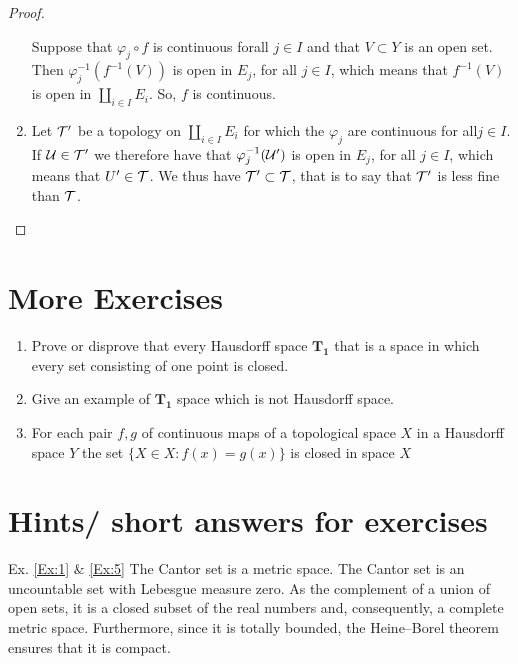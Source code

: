 \begin{proof}
\begin{enumerate}
Suppose that $\varphi_j\circ f$ is continuous forall $j\in I$ and that $V \subset Y$ is an open set. Then $ \varphi_j^{-1}(f^{-1}(V))$ is open in
$E_j $, for all $ j \in I$, which means that $f^{-1}(V)$ is open in $ \coprod_{i\in I}E_i$. So, $f$ is continuous.

\vspace{5pt}
\item Let $\mathcal{T}'$ be a topology on $\coprod_{i\in I}E_i$ for which the $\varphi_j$ are continuous for all$j \in I$. If $\mathcal{U}\in \mathcal{T}'$ we therefore have that $\varphi_j^{-1}(\mathcal{U}')$ is open in $ E_j$, for all $j \in I$, which means that $U' \in \mathcal{T}$. We thus have $\mathcal{T}' \subset \mathcal{T}$, that is to say that $\mathcal{T}'$ is less fine than $\mathcal{T}$.
\end{enumerate}
\end{proof}


\section{More Exercises}

\begin{enumerate}

\item Prove or disprove that every Hausdorff space $\mathbf{T_1}$ that is a space in which every set consisting of one point is closed.\\

\item Give an example of $\mathbf{T_1}$ space which is not Hausdorff space.\\

\item For each pair $f,g$ of continuous maps of a topological space $X$ in a Hausdorff space $Y$ the set 
$\{ X\in X: f(x)=g(x)\}$ is closed in space $X$
\end{enumerate}





\section{Hints/ short answers for exercises}

Ex. \ref{Ex:1} $\&$ \ref{Ex:5} The Cantor set is a metric space. 
The Cantor set is an uncountable set with Lebesgue measure zero. As the complement of a union of open sets, it is a closed subset of the real numbers and, consequently, a complete metric space. 
Furthermore, since it is totally bounded, the Heine–Borel theorem ensures that it is compact.
\, 

